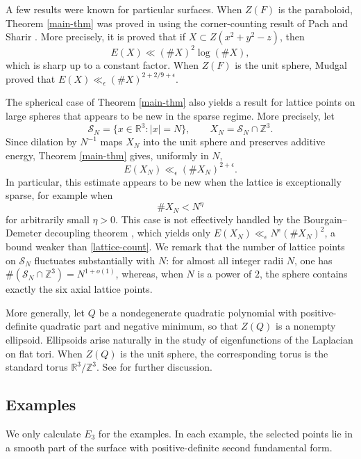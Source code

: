 \documentclass{amsart}%
\numberwithin{equation}{section}
\newcommand{\e}{\epsilon}
\newcommand{\ZR}{\mathbb{R}}
\newcommand{\ZZ}{\mathbb{Z}}
\newcommand{\1}{\mathbbm{1}}
\begin{document}
\medskip

A few results were known for particular surfaces.
When $Z(F)$ is the paraboloid, Theorem \ref{main-thm} was proved in \cite{Bourgain-Demeter} using the corner-counting result of Pach and Sharir \cite{Pach-Sharir}.
More precisely, it is proved that if $X\subset Z(x^2+y^2-z)$, then
\[
    E(X)\ll (\#X)^2\log (\#X),
\]
which is sharp up to a constant factor.
When $Z(F)$ is the unit sphere, Mudgal \cite{Mudgal-sphere} proved that $E(X)\ll_\e (\#X)^{2+2/9+\e}$.

The spherical case of Theorem \ref{main-thm} also yields a result for lattice points on large spheres that appears to be new in the sparse regime.
More precisely, let
\[
    \mathcal{S}_N
    =
    \bigl\{x\in\mathbb{R}^3:|x|=N\bigr\},
    \qquad
    X_N
    =
    \mathcal{S}_N\cap\mathbb{Z}^3.
\]
Since dilation by $N^{-1}$ maps $X_N$ into the unit sphere and preserves additive energy, Theorem \ref{main-thm} gives,  uniformly in $N$,
\begin{equation}
\label{lattice-count}
    E(X_N)\ll_{\e}(\#X_N)^{2+\e}.
\end{equation}
In particular, this estimate appears to be new when the lattice is exceptionally sparse, for example when
\[
    \#X_N<N^\eta
\]
for arbitrarily small $\eta>0$.
This case is not effectively handled by the Bourgain--Demeter decoupling theorem \cite{Bourgain-Demeter}, which yields only $E(X_N)\ll_\e N^\e(\# X_N)^2$, a bound weaker than \eqref{lattice-count}.
We remark that the number of lattice points on $\mathcal{S}_N$ fluctuates substantially with $N$: for almost all integer radii $N$, one has $\#(\mathcal{S}_N\cap\mathbb{Z}^3)=N^{1+o(1)}$, whereas, when $N$ is a power of $2$, the sphere contains exactly the six axial lattice points.

\smallskip 

More generally, let $Q$ be a nondegenerate quadratic polynomial with positive-definite quadratic part and negative minimum, so that $Z(Q)$ is a nonempty ellipsoid. Ellipsoids arise naturally in the study of eigenfunctions of the Laplacian on flat tori.
When $Z(Q)$ is the unit sphere, the corresponding torus is the standard torus $\ZR^3/\ZZ^3$. See \cite{GRP} for further discussion.

\bigskip

\subsection{Examples}
\label{example-section}
We only calculate $E_3$ for the examples.
In each example, the selected points lie in a smooth part of the surface with positive-definite second fundamental form.
\end{document}
